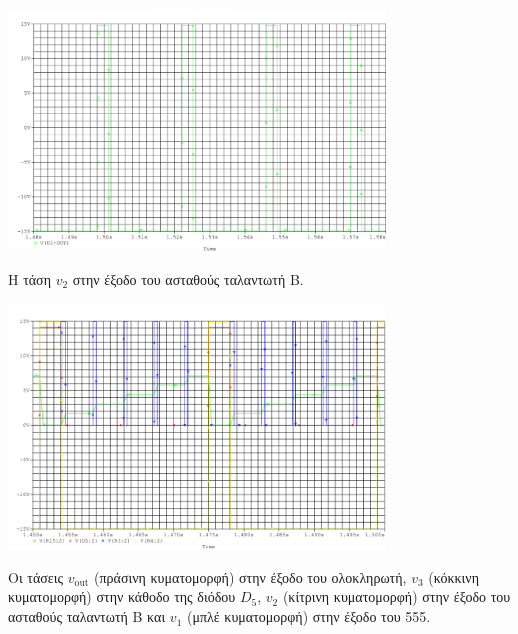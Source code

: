 \begin{plot_fig}[H]
	\begin{center}
		\includegraphics[width=10cm]{spice_02/lab2 q3.2}
		\caption{Η τάση $v_2$ στην έξοδο του ασταθούς ταλαντωτή Β.}
		\label{plot:ask2:q3_2}
	\end{center}
\end{plot_fig}

\begin{plot_fig}[H]
	\begin{center}
		\includegraphics[width=10cm]{spice_02/lab2 q4}
		\caption{Οι τάσεις $v_{\mathrm{out}}$ (πράσινη κυματομορφή) στην έξοδο του ολοκληρωτή, $v_3$ (κόκκινη κυματομορφή) στην κάθοδο της διόδου $D_5$, $v_2$ (κίτρινη κυματομορφή) στην έξοδο του ασταθούς ταλαντωτή Β και $v_1$ (μπλέ κυματομορφή) στην έξοδο του 555.}
		\label{plot:ask2:q4_1}
	\end{center}
\end{plot_fig}